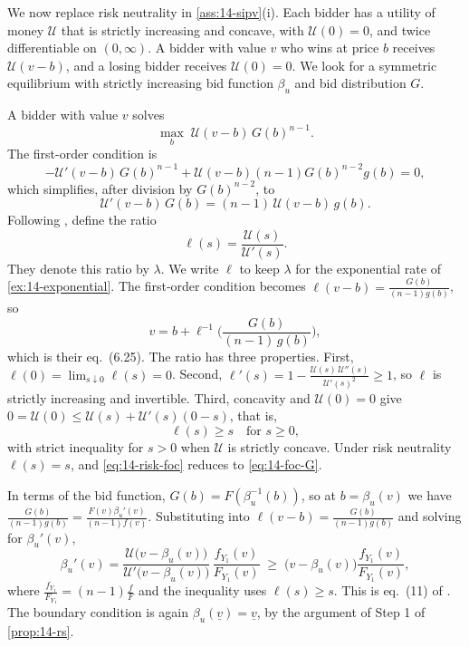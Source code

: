 We now replace risk neutrality in \cref{ass:14-sipv}(i). Each bidder has a utility of money $\mathcal U$ that is strictly increasing and concave, with $\mathcal U(0)=0$, and twice differentiable on $(0,\infty)$. A bidder with value $v$ who wins at price $b$ receives $\mathcal U(v-b)$, and a losing bidder receives $\mathcal U(0)=0$. We look for a symmetric equilibrium with strictly increasing bid function $\beta_u$ and bid distribution $G$.

A bidder with value $v$ solves
\[
\max_b\;\mathcal U(v-b)\,G(b)^{n-1}.
\]
The first-order condition is
\[
-\mathcal U'(v-b)\,G(b)^{n-1}+\mathcal U(v-b)(n-1)G(b)^{n-2}g(b)=0,
\]
which simplifies, after division by $G(b)^{n-2}$, to
\[
\mathcal U'(v-b)\,G(b)=(n-1)\,\mathcal U(v-b)\,g(b).
\]
Following \citet[eq.~(6.24)]{AtheyHaile2007}, define the ratio
\begin{equation}\label{eq:14-ell}
\ell(s)=\frac{\mathcal U(s)}{\mathcal U'(s)}.
\end{equation}
They denote this ratio by $\lambda$. We write $\ell$ to keep $\lambda$ for the exponential rate of \cref{ex:14-exponential}. The first-order condition becomes $\ell(v-b)=\frac{G(b)}{(n-1)g(b)}$, so
\begin{equation}\label{eq:14-risk-foc}
v=b+\ell^{-1}\Big(\frac{G(b)}{(n-1)\,g(b)}\Big),
\end{equation}
which is their eq.~(6.25). The ratio has three properties. First, $\ell(0)=\lim_{s\downarrow 0}\ell(s)=0$. Second, $\ell'(s)=1-\frac{\mathcal U(s)\,\mathcal U''(s)}{\mathcal U'(s)^2}\ge 1$, so $\ell$ is strictly increasing and invertible. Third, concavity and $\mathcal U(0)=0$ give $0=\mathcal U(0)\le\mathcal U(s)+\mathcal U'(s)(0-s)$, that is,
\[
\ell(s)\ge s\quad\text{for } s\ge 0,
\]
with strict inequality for $s>0$ when $\mathcal U$ is strictly concave. Under risk neutrality $\ell(s)=s$, and \eqref{eq:14-risk-foc} reduces to \eqref{eq:14-foc-G}.

In terms of the bid function, $G(b)=F(\beta_u^{-1}(b))$, so at $b=\beta_u(v)$ we have $\frac{G(b)}{(n-1)g(b)}=\frac{F(v)\beta_u'(v)}{(n-1)f(v)}$. Substituting into $\ell(v-b)=\frac{G(b)}{(n-1)g(b)}$ and solving for $\beta_u'(v)$,
\begin{equation}\label{eq:14-risk-ode}
\beta_u'(v)=\frac{\mathcal U\big(v-\beta_u(v)\big)}{\mathcal U'\big(v-\beta_u(v)\big)}\,\frac{f_{Y_1}(v)}{F_{Y_1}(v)}\;\ge\;\big(v-\beta_u(v)\big)\frac{f_{Y_1}(v)}{F_{Y_1}(v)},
\end{equation}
where $\frac{f_{Y_1}}{F_{Y_1}}=(n-1)\frac{f}{F}$ and the inequality uses $\ell(s)\ge s$. This is eq.~(11) of \citet{MilgromWeber1982}. The boundary condition is again $\beta_u(\underline v)=\underline v$, by the argument of Step 1 of \cref{prop:14-rs}.

